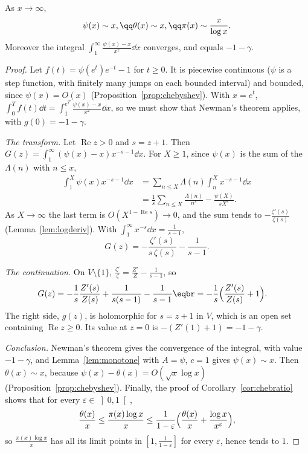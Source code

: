 \begin{theorem}\label{thm:pnt}
As $x\to\infty$,
\[
\begin{gathered}\psi(x)\sim x,\qq\theta(x)\sim x,\qq\pi(x)\sim\frac x{\log x}.\end{gathered}
\]
Moreover the integral $\displaystyle\int_1^\infty\frac{\psi(x)-x}{x^2}\dd x$ converges, and equals $-1-\gamma$.
\end{theorem}
\begin{proof}
Let $f(t)=\psi(e^t)e^{-t}-1$ for $t\ge0$. It is piecewise continuous ($\psi$ is a step function, with finitely many jumps on each bounded interval) and bounded, since
$\psi(x)=O(x)$ (Proposition~\ref{prop:chebyshev}). With $x=e^t$, $\int_0^Tf(t)\dd t=\int_1^{e^T}\frac{\psi(x)-x}{x^2}\dd x$, so we must show that Newman's theorem applies, with
$g(0)=-1-\gamma$.

\emph{The transform.} Let $\operatorname{Re}z>0$ and $s=z+1$. Then $G(z)=\int_1^\infty(\psi(x)-x)x^{-s-1}\dd x$. For $X\ge1$, since $\psi(x)$ is the sum of the $\Lambda(n)$ with $n\le x$,
\[
\begin{aligned}\int_1^X\psi(x)x^{-s-1}\dd x&=\sum_{n\le X}\Lambda(n)\int_n^Xx^{-s-1}\dd x\\&=\frac1s\sum_{n\le X}\frac{\Lambda(n)}{n^s}-\frac{\psi(X)}{sX^s}.\end{aligned}
\]
As $X\to\infty$ the last term is $O(X^{1-\operatorname{Re}s})\to0$, and the sum tends to $-\frac{\zeta'(s)}{\zeta(s)}$ (Lemma~\ref{lem:logderiv}). With $\int_1^\infty x^{-s}\dd x=\frac1{s-1}$,
\[
G(z)=-\frac{\zeta'(s)}{s\,\zeta(s)}-\frac1{s-1}.
\]

\emph{The continuation.} On $V\setminus\{1\}$, $\frac{\zeta'}\zeta=\frac{Z'}Z-\frac1{s-1}$, so
\[
\begin{aligned}G(z)&=-\frac1s\frac{Z'(s)}{Z(s)}+\frac1{s(s-1)}-\frac1{s-1}\eqbr=-\frac1s\Bigl(\frac{Z'(s)}{Z(s)}+1\Bigr).\end{aligned}
\]
The right side, $g(z)$, is holomorphic for $s=z+1$ in $V$, which is an open set containing $\operatorname{Re}z\ge0$. Its value at $z=0$ is $-(Z'(1)+1)=-1-\gamma$.

\emph{Conclusion.} Newman's theorem gives the convergence of the integral, with value $-1-\gamma$, and Lemma~\ref{lem:monotone} with $A=\psi$, $c=1$ gives $\psi(x)\sim x$. Then
$\theta(x)\sim x$, because $\psi(x)-\theta(x)=O(\sqrt x\log x)$ (Proposition~\ref{prop:chebyshev}). Finally, the proof of Corollary~\ref{cor:chebratio} shows that for every $\varepsilon\in\left]0,1\right[$,
\[
\frac{\theta(x)}x\le\frac{\pi(x)\log x}x\le\frac1{1-\varepsilon}\Bigl(\frac{\theta(x)}x+\frac{\log x}{x^\varepsilon}\Bigr),
\]
so $\frac{\pi(x)\log x}x$ has all its limit points in $[1,\frac1{1-\varepsilon}]$ for every $\varepsilon$, hence tends to $1$.
\end{proof}

